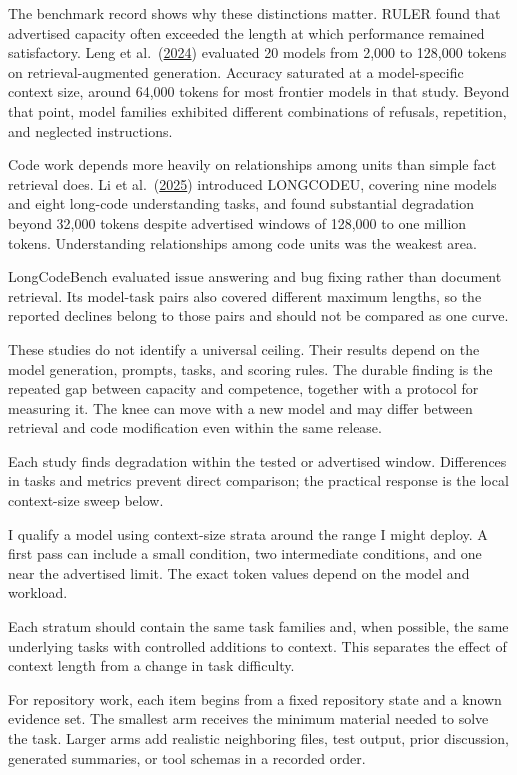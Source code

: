 The benchmark record shows why these distinctions matter. RULER found that advertised capacity often exceeded the length at which performance remained satisfactory. Leng et al.~(\href{https://arxiv.org/abs/2411.03538}{2024}) evaluated 20 models from 2,000 to 128,000 tokens on retrieval-augmented generation. Accuracy saturated at a model-specific context size, around 64,000 tokens for most frontier models in that study. Beyond that point, model families exhibited different combinations of refusals, repetition, and neglected instructions.

Code work depends more heavily on relationships among units than simple fact retrieval does. Li et al.~(\href{https://arxiv.org/abs/2503.04359}{2025}) introduced LONGCODEU, covering nine models and eight long-code understanding tasks, and found substantial degradation beyond 32,000 tokens despite advertised windows of 128,000 to one million tokens. Understanding relationships among code units was the weakest area.

LongCodeBench evaluated issue answering and bug fixing rather than document retrieval. Its model-task pairs also covered different maximum lengths, so the reported declines belong to those pairs and should not be compared as one curve.

These studies do not identify a universal ceiling. Their results depend on the model generation, prompts, tasks, and scoring rules. The durable finding is the repeated gap between capacity and competence, together with a protocol for measuring it. The knee can move with a new model and may differ between retrieval and code modification even within the same release.

Each study finds degradation within the tested or advertised window. Differences in tasks and metrics prevent direct comparison; the practical response is the local context-size sweep below.

I qualify a model using context-size strata around the range I might deploy. A first pass can include a small condition, two intermediate conditions, and one near the advertised limit. The exact token values depend on the model and workload.

Each stratum should contain the same task families and, when possible, the same underlying tasks with controlled additions to context. This separates the effect of context length from a change in task difficulty.

For repository work, each item begins from a fixed repository state and a known evidence set. The smallest arm receives the minimum material needed to solve the task. Larger arms add realistic neighboring files, test output, prior discussion, generated summaries, or tool schemas in a recorded order.

